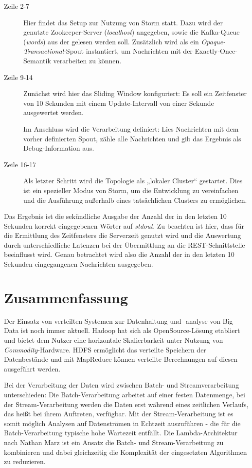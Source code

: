 \documentclass[a4paper,11pt]{scrartcl}
\begin{document}
  \begin{description}
    \item[Zeile 2-7] Hier findet das Setup zur Nutzung von Storm statt. Dazu
      wird der genutzte Zookeeper-Server (\textit{localhost}) angegeben, sowie
      die Kafka-Queue (\textit{words}) aus der gelesen werden soll. Zusätzlich
      wird als ein \textit{Opaque-Transactional}-Spout instantiert, um
      Nachrichten mit der Exactly-Once-Semantik verarbeiten zu können.
    \item[Zeile 9-14] Zunächst wird hier das Sliding Window konfiguriert: Es
      soll ein Zeitfenster von 10 Sekunden mit einem Update-Intervall von einer
      Sekunde ausgewertet werden. 
      
      Im Anschluss wird die Verarbeitung definiert: Lies Nachrichten mit dem
      vorher definierten Spout, zähle alle Nachrichten und gib das Ergebnis als
      Debug-Information aus.
    \item[Zeile 16-17] Als letzter Schritt wird die Topologie als „lokaler
      Cluster“ gestartet. Dies ist ein spezieller Modus von Storm, um die
      Entwicklung zu vereinfachen und die Ausführung außerhalb eines
      tatsächlichen Clusters zu ermöglichen.
  \end{description}

  Das Ergebnis ist die sekündliche Ausgabe der Anzahl der in den letzten 10
  Sekunden korrekt eingegebenen Wörter auf \textit{stdout}. Zu beachten ist
  hier, dass für die Ermittlung des Zeitfensters die Serverzeit genutzt wird
  und die Auswertung durch unterschiedliche Latenzen bei der Übermittlung an
  die REST-Schnittstelle beeinflusst wird. Genau betrachtet wird also die
  Anzahl der in den letzten 10 Sekunden eingegangenen Nachrichten ausgegeben.

  \section{Zusammenfassung}
  Der Einsatz von verteilten Systemen zur Datenhaltung und -analyse von Big
  Data ist noch immer aktuell. Hadoop hat sich als OpenSource-Lösung etabliert
  und bietet dem Nutzer eine horizontale Skalierbarkeit unter Nutzung von
  \textit{Commodity}-Hardware. HDFS ermöglicht das verteilte Speichern der
  Datenbestände und mit MapReduce können verteilte Berechnungen auf diesen
  ausgeführt werden.

  Bei der Verarbeitung der Daten wird zwischen Batch- und Streamverarbeitung
  unterschieden: Die Batch-Verarbeitung arbeitet auf einer festen Datenmenge,
  bei der Stream-Verarbeitung werden die Daten erst während eines zeitlichen
  Verlaufs, das heißt bei ihrem Auftreten, verfügbar. Mit der
  Stream-Verarbeitung ist es somit möglich Analysen auf Datenströmen in
  Echtzeit auszuführen - die für die Batch-Verarbeitung typische hohe Wartezeit
  entfällt. Die Lambda-Architektur nach Nathan Marz ist ein Ansatz die Batch-
  und Stream-Verarbeitung zu kombinieren und dabei gleichzeitig die Komplexität
  der eingesetzten Algorithmen zu reduzieren. 
\end{document}
